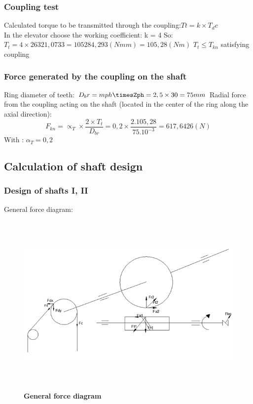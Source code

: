 \subsubsection{Coupling test}
Calculated torque to be transmitted through the coupling:$Tt = k\times T_dc$\\
In the elevator choose the working coefficient: k = 4
So: $T_t = 4\times26321,0733 = 105284,293 (Nmm) = 105,28 (Nm)$
 $T_t\le T_{kn}$ satisfying coupling

\subsubsection{Force generated by the coupling on the shaft}
Ring diameter of teeth: $ D_br = mph\timesZph = 2,5\times30 = 75 mm$
Radial force from the coupling acting on the shaft (located in the center of the ring along the axial direction):
$$F_{kn}=\propto_T\times\frac{2\times T_t}{D_{br}}=0,2\times\frac{2.105,28}{{75.10}^{-3}}=617,6426\left(N\right)$$
With : $\alpha_T=0,2$
\subsection{Calculation of shaft design}
\subsubsection{Design of shafts I, II}
General force diagram:

\begin{figure}[!ht]
    \centering
   \centerline{\includegraphics[width=16cm,height=9cm]{Image/force_diagram.png}}
    \caption[General force diagram]{\bfseries \fontsize{12pt}{0pt}\selectfont General force diagram}
    \label{figure1}
\end{figure}

